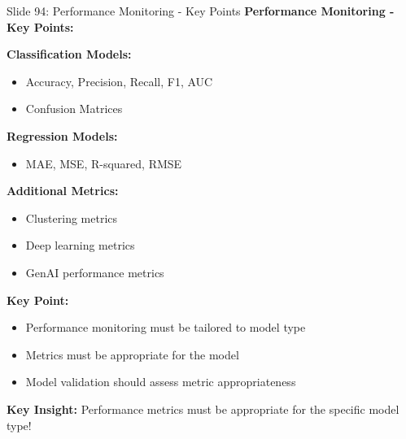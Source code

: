 \documentclass[8pt]{beamer}
\begin{document}
	\begin{frame}{Slide 94: Performance Monitoring - Key Points}
		\fontsize{6.5}{7.5}\selectfont
		\textbf{Performance Monitoring - Key Points:}
		
		\vspace{0.1cm}
		\textbf{Classification Models:}
		\begin{itemize}
			\item Accuracy, Precision, Recall, F1, AUC
			\item Confusion Matrices
		\end{itemize}
		
		\vspace{0.1cm}
		\textbf{Regression Models:}
		\begin{itemize}
			\item MAE, MSE, R-squared, RMSE
		\end{itemize}
		
		\vspace{0.1cm}
		\textbf{Additional Metrics:}
		\begin{itemize}
			\item Clustering metrics
			\item Deep learning metrics
			\item GenAI performance metrics
		\end{itemize}
		
		\vspace{0.1cm}
		\textbf{Key Point:}
		\begin{itemize}
			\item Performance monitoring must be tailored to model type
			\item Metrics must be appropriate for the model
			\item Model validation should assess metric appropriateness
		\end{itemize}
		
		\textcolor{myblue}{\textbf{Key Insight:}} Performance metrics must be \textcolor{myblue}{appropriate for the specific model type}!
	\end{frame}
	
\end{document}
